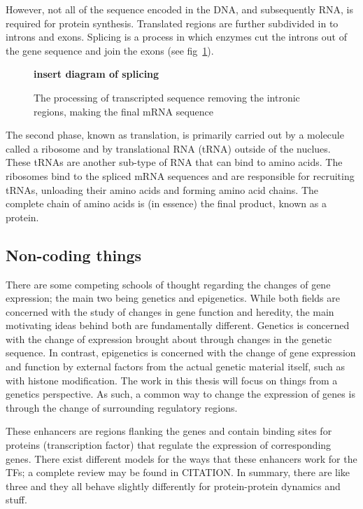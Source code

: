However, not all of the sequence encoded in the DNA, and subsequently RNA, is required for protein synthesis. Translated regions are further subdivided in to introns and exons. Splicing is a process in which enzymes cut the introns out of the gene sequence and join the exons (see fig~\ref{fig:splicing}).

    \begin{figure}
        \centering
        {\color{red} \textbf{insert diagram of splicing}}
        \caption{The processing of transcripted sequence removing the intronic regions, making the final mRNA sequence}
        \label{fig:splicing}
    \end{figure}
    

    

The second phase, known as translation, is primarily carried out by a molecule called a ribosome and by translational RNA (tRNA) outside of the nuclues. These tRNAs are another sub-type of RNA that can bind to amino acids. The ribosomes bind to the spliced mRNA sequences and are responsible for recruiting tRNAs, {\color{red}unloading} their amino acids and forming amino acid chains. The complete chain of amino acids is (in essence) the {\color{red}final} product, known as a protein. 

\subsection{Non-coding things}
There are some competing schools of thought regarding the changes of gene expression; the main two being genetics and epigenetics. While both fields are concerned with the study of changes in gene function and heredity, the main motivating ideas behind both are fundamentally different. Genetics is concerned with the change of expression brought about through changes in the genetic sequence. In contrast, epigenetics is concerned with the change of gene expression and function by external factors from the actual genetic material itself, such as with histone modification. The work in this thesis will focus on things from a genetics perspective. As such, a common way to change the expression of genes is through the change of surrounding regulatory regions.

These enhancers are regions flanking the genes and contain binding sites for proteins (transcription factor) that regulate the expression of corresponding genes. There exist different models for the ways that these enhancers work for the TFs; a complete review may be found in {\color{red} CITATION}. In summary, there are like three and they all behave slightly differently for protein-protein dynamics and stuff.


